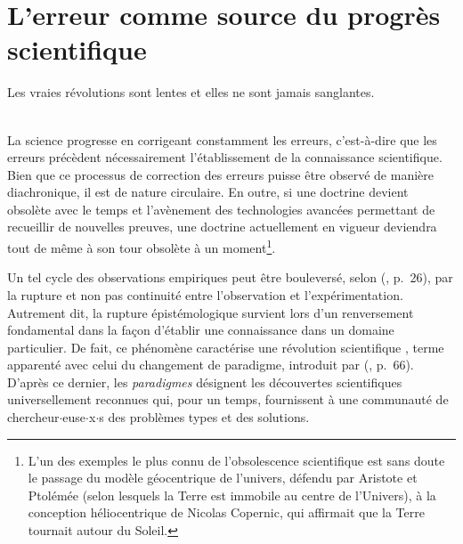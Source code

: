 \label{circulations}
\minitoc%
\section{L'erreur comme source du progrès scientifique}
\begin{myepigraph}
\small
\og{}Les vraies révolutions sont lentes et elles ne sont jamais sanglantes.\fg{}\\[-1ex]
\\ 
\end{myepigraph}
\medskip
La science progresse en corrigeant constamment les erreurs, c'est-à-dire que les erreurs précèdent nécessairement l'établissement de la connaissance scientifique. Bien que ce processus de correction des erreurs puisse être observé de manière diachronique, il est de nature circulaire. En outre, si une doctrine devient obsolète avec le temps et l'avènement des technologies avancées permettant de recueillir de nouvelles preuves, une doctrine actuellement en vigueur deviendra tout de même à son tour obsolète à un moment\footnote{L'un des exemples le plus connu de l'obsolescence scientifique est sans doute le passage du modèle géocentrique de l'univers, défendu par Aristote et Ptolémée (selon lesquels la Terre est immobile au centre de l'Univers), à la conception héliocentrique de Nicolas Copernic, qui affirmait que la Terre tournait autour du Soleil.}.


Un tel cycle des observations empiriques peut être bouleversé, selon \citeauthor{bachelard1934formation} (\citeyear{bachelard1934formation}, p.~26), par la \og{}rupture et non pas continuité entre l'observation et l'expérimentation\fg{}. Autrement dit, la rupture épistémologique survient lors d'un renversement fondamental dans la façon d'établir une connaissance dans un domaine particulier. De fait, ce phénomène caractérise une \og{}révolution scientifique\fg{} \citep[p.~2]{koyre1957closed}, terme apparenté avec celui du \og{}changement de paradigme\fg{}, introduit par \citeauthor{kuhn1962structure} (\citeyear{kuhn1962structure}, p.~66). D'après ce dernier, les \textit{paradigmes} désignent les \og{}découvertes scientifiques universellement reconnues qui, pour un temps, fournissent à une communauté de chercheur$\cdot$euse$\cdot$x$\cdot$s des problèmes types et des solutions\fg{}. 

